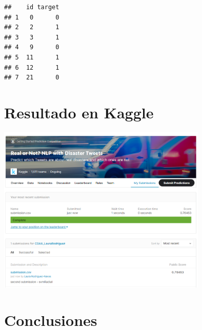 \documentclass[]{article}
\newenvironment{Shaded}{\begin{snugshade}}{\end{snugshade}}
\newcommand{\DataTypeTok}[1]{\textcolor[rgb]{0.13,0.29,0.53}{#1}}
\newcommand{\DecValTok}[1]{\textcolor[rgb]{0.00,0.00,0.81}{#1}}
\newcommand{\KeywordTok}[1]{\textcolor[rgb]{0.13,0.29,0.53}{\textbf{#1}}}
\newcommand{\NormalTok}[1]{#1}
\newcommand{\OperatorTok}[1]{\textcolor[rgb]{0.81,0.36,0.00}{\textbf{#1}}}
\newcommand{\OtherTok}[1]{\textcolor[rgb]{0.56,0.35,0.01}{#1}}
\newcommand{\StringTok}[1]{\textcolor[rgb]{0.31,0.60,0.02}{#1}}
\begin{document}
\vspace{2mm}


\begin{Shaded}
\end{Shaded}

\begin{verbatim}
##    id target
## 1   0      0
## 2   2      1
## 3   3      1
## 4   9      0
## 5  11      1
## 6  12      1
## 7  21      0
\end{verbatim}

\hypertarget{resultado-en-kaggle}{%
\section{Resultado en Kaggle}\label{resultado-en-kaggle}}

\begin{center}
	\includegraphics[width=0.75\textwidth,height=\textheight]{submission.png}
\end{center}

\hypertarget{conclusiones}{%
\section{Conclusiones}\label{conclusiones}}
\end{document}
